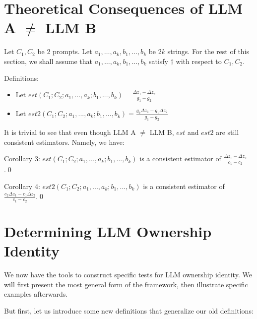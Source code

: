\documentclass{article}
\begin{document}
\section{Theoretical Consequences of LLM A $\neq$ LLM B}
\begin{mdframed}
Let $C_1, C_2$ be 2 prompts. Let $a_1,\ldots,a_k,b_1,\ldots,b_k$ be $2k$ strings.
For the rest of this section, we shall assume that
$a_1,\ldots,a_k,b_1,\ldots,b_k$ satisfy $\dagger$ with respect to $C_1, C_2$.
\end{mdframed}


Definitions:
\begin{itemize}
\item Let $\displaystyle est\left( C_{1} ;C_{2} ;a_{1} ,...,a_{k} ;b_{1} ,...,b_{k}\right) =\frac{\Delta z_{1} -\Delta z_{2}}{g_{1} -g_{2}}$
\item Let $\displaystyle est2\left( C_{1} ;C_{2} ;a_{1} ,...,a_{k} ;b_{1} ,...,b_{k}\right) =\frac{g_{2} \Delta z_{1} -g_{1} \Delta z_{2}}{g_{1} -g_{2}}$
\end{itemize}

It is trivial to see that even though LLM A $\displaystyle \neq $ LLM B, $\displaystyle est$ and $\displaystyle est2$ are still consistent estimators. Namely, we have:



Corollary 3: $\displaystyle est\left( C_{1} ;C_{2} ;a_{1} ,...,a_{k} ;b_{1} ,...,b_{k}\right)$ is a consistent estimator of $\displaystyle \frac{\Delta z_{1} -\Delta z_{2}}{c_{1} -c_{2}}$.\qed 



Corollary 4: $\displaystyle est2\left( C_{1} ;C_{2} ;a_{1} ,...,a_{k} ;b_{1} ,...,b_{k}\right)$ is a consistent estimator of $\displaystyle \frac{c_{2} \Delta z_{1} -c_{1} \Delta z_{2}}{c_{1} -c_{2}}$.\qed 



\section{Determining LLM Ownership Identity}

We now have the tools to construct specific tests for LLM ownership identity. We will first present the most general form of the framework, then illustrate specific examples afterwards.



But first, let us introduce some new definitions that generalize our old definitions:
\end{document}
